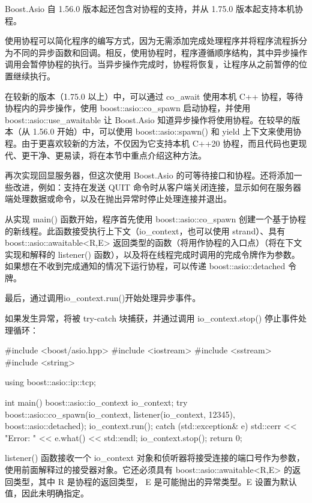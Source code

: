 Boost.Asio 自 1.56.0 版本起还包含对协程的支持，并从 1.75.0 版本起支持本机协程。

使用协程可以简化程序的编写方式，因为无需添加完成处理程序并将程序流程拆分为不同的异步函数和回调。相反，使用协程时，程序遵循顺序结构，其中异步操作调用会暂停协程的执行。当异步操作完成时，协程将恢复，让程序从之前暂停的位置继续执行。

在较新的版本（1.75.0 以上）中，可以通过 co\_await 使用本机 C++ 协程，等待协程内的异步操作，使用 boost::asio::co\_spawn 启动协程，并使用 boost::asio::use\_awaitable 让 Boost.Asio 知道异步操作将使用协程。在较早的版本（从 1.56.0 开始）中，可以使用 boost::asio::spawn() 和 yield 上下文来使用协程。由于更喜欢较新的方法，不仅因为它支持本机 C++20 协程，而且代码也更现代、更干净、更易读，将在本节中重点介绍这种方法。

再次实现回显服务器，但这次使用 Boost.Asio 的可等待接口和协程。还将添加一些改进，例如：支持在发送 QUIT 命令时从客户端关闭连接，显示如何在服务器端处理数据或命令，以及在抛出异常时停止处理连接并退出。

从实现 main() 函数开始，程序首先使用 boost::asio::co\_spawn 创建一个基于协程的新线程。此函数接受执行上下文（io\_context，也可以使用 strand）、具有 boost::asio::awaitable<R,E> 返回类型的函数（将用作协程的入口点）（将在下文实现和解释的 listener() 函数），以及将在线程完成时调用的完成令牌作为参数。如果想在不收到完成通知的情况下运行协程，可以传递 boost::asio::detached 令牌。

最后，通过调用io\_context.run()开始处理异步事件。

如果发生异常，将被 try-catch 块捕获，并通过调用 io\_context.stop() 停止事件处理循环：

\begin{cpp}
#include <boost/asio.hpp>
#include <iostream>
#include <sstream>
#include <string>

using boost::asio::ip::tcp;

int main() {
    boost::asio::io_context io_context;
    try {
        boost::asio::co_spawn(io_context,
                    listener(io_context, 12345),
                    boost::asio::detached);
        io_context.run();
    } catch (std::exception& e) {
        std::cerr << "Error: " << e.what() << std::endl;
        io_context.stop();
    }
    return 0;
}
\end{cpp}

listener() 函数接收一个 io\_context 对象和侦听器将接受连接的端口号作为参数，使用前面解释过的接受器对象。它还必须具有 boost::asio::awaitable<R,E> 的返回类型，其中 R 是协程的返回类型， E 是可能抛出的异常类型。E 设置为默认值，因此未明确指定。

